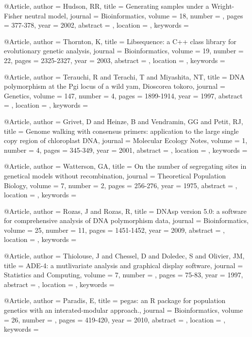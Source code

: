 @Article{,
author = {Hudson, RR}, 
title = {Generating samples under a Wright-Fisher neutral model}, 
journal = {Bioinformatics}, 
volume = {18}, 
number = {}, 
pages = {377-378}, 
year = {2002}, 
abstract = {}, 
location = {}, 
keywords = {}}


@Article{,
author = {Thornton, K}, 
title = {Libsequence: a C++ class library for evolutionary genetic analysis}, 
journal = {Bioinformatics}, 
volume = {19}, 
number = {22}, 
pages = {2325-2327}, 
year = {2003}, 
abstract = {}, 
location = {}, 
keywords = {}}


@Article{,
author = {Terauchi, R and Terachi, T and Miyashita, NT}, 
title = {DNA polymorphism at the Pgi locus of a wild yam, Dioscorea tokoro}, 
journal = {Genetics}, 
volume = {147}, 
number = {4}, 
pages = {1899-1914}, 
year = {1997}, 
abstract = {}, 
location = {}, 
keywords = {}}


@Article{,
author = {Grivet, D and Heinze, B and Vendramin, GG and Petit, RJ}, 
title = {Genome walking with consensus primers: application to the large single copy region of chloroplast DNA}, 
journal = {Molecular Ecology Notes}, 
volume = {1}, 
number = {4}, 
pages = {345-349}, 
year = {2001}, 
abstract = {}, 
location = {}, 
keywords = {}}


@Article{,
author = {Watterson, GA}, 
title = {On the number of segregating sites in genetical models without recombination}, 
journal = {Theoretical Population Biology}, 
volume = {7}, 
number = {2}, 
pages = {256-276}, 
year = {1975}, 
abstract = {}, 
location = {}, 
keywords = {}}


@Article{,
author = {Rozas, J and Rozas, R}, 
title = {DNAsp version 5.0: a software for comprehensive analysis of DNA polymorphism data}, 
journal = {Bioinformatics}, 
volume = {25}, 
number = {11}, 
pages = {1451-1452}, 
year = {2009}, 
abstract = {}, 
location = {}, 
keywords = {}}


@Article{,
author = {Thiolouse, J and Chessel, D and Doledec, S and Olivier, JM}, 
title = {ADE-4: a mutlivariate analysis and graphical display software}, 
journal = {Statistics and Computing}, 
volume = {7}, 
number = {}, 
pages = {75-83}, 
year = {1997}, 
abstract = {}, 
location = {}, 
keywords = {}}


@Article{,
author = {Paradis, E}, 
title = {pegas: an R package for population genetics with an interated-modular approach.}, 
journal = {Bioinformatics}, 
volume = {26}, 
number = {}, 
pages = {419-420}, 
year = {2010}, 
abstract = {}, 
location = {}, 
keywords = {}}


